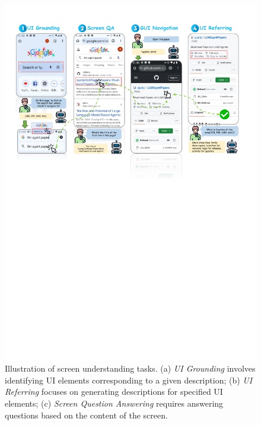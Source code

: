 \begin{figure}[ht]
    \centering
    \includegraphics[width=0.95\linewidth]{figures/ui_understanding_tasks.pdf}
    \caption{Illustration of screen understanding tasks. (a) \textit{UI Grounding} involves identifying UI elements corresponding to a given description; (b) \textit{UI Referring} focuses on generating descriptions for specified UI elements; (c) \textit{Screen Question Answering} requires answering questions based on the content of the screen.}
    \label{fig:ui_understanding_tasks}
\end{figure}

